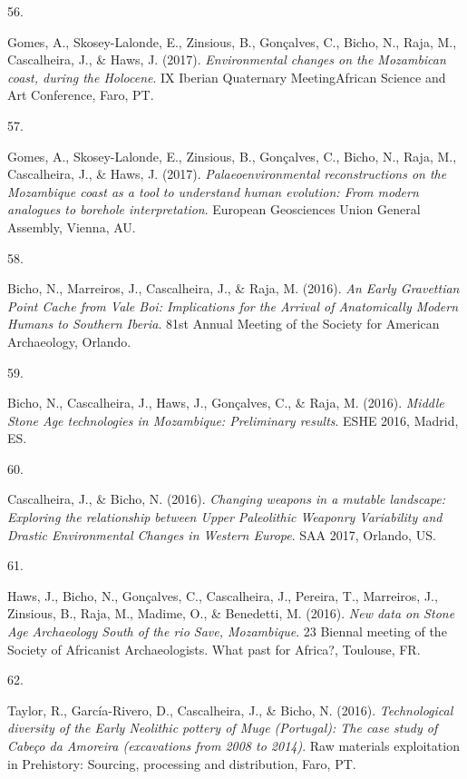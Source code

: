 \documentclass[11pt,a4paper,]{awesome-cv}
\newlength{\cslhangindent}
\newlength{\csllabelwidth}
\newenvironment{CSLReferences}[2] %
 {\begin{list}{}{%
  \setlength{\itemindent}{0pt}
  \setlength{\leftmargin}{0pt}
  \setlength{\parsep}{0pt}
  \ifodd #1
   \setlength{\leftmargin}{\cslhangindent}
   \setlength{\itemindent}{-1\cslhangindent}
  \fi
  \setlength{\itemsep}{#2\baselineskip}}}
 {\end{list}}
\newcommand{\CSLLeftMargin}[1]{\parbox[t]{\csllabelwidth}{\strut#1\strut}}
\newcommand{\CSLRightInline}[1]{\parbox[t]{\linewidth - \csllabelwidth}{\strut#1\strut}}
\begin{document}
\begin{CSLReferences}{0}{0}
\CSLLeftMargin{56. }%
\CSLRightInline{Gomes, A., Skosey-Lalonde, E., Zinsious, B., Gonçalves,
C., Bicho, N., Raja, M., Cascalheira, J., \& Haws, J. (2017).
\emph{Environmental changes on the Mozambican coast, during the
Holocene}. IX Iberian Quaternary MeetingAfrican Science and Art
Conference, Faro, PT.}

\CSLLeftMargin{57. }%
\CSLRightInline{Gomes, A., Skosey-Lalonde, E., Zinsious, B., Gonçalves,
C., Bicho, N., Raja, M., Cascalheira, J., \& Haws, J. (2017).
\emph{Palaeoenvironmental reconstructions on the Mozambique coast as a
tool to understand human evolution: From modern analogues to borehole
interpretation}. European Geosciences Union General Assembly, Vienna,
AU.}

\CSLLeftMargin{58. }%
\CSLRightInline{Bicho, N., Marreiros, J., Cascalheira, J., \& Raja, M.
(2016). \emph{An Early Gravettian Point Cache from Vale Boi:
Implications for the Arrival of Anatomically Modern Humans to Southern
Iberia}. 81st Annual Meeting of the Society for American Archaeology,
Orlando.}

\CSLLeftMargin{59. }%
\CSLRightInline{Bicho, N., Cascalheira, J., Haws, J., Gonçalves, C., \&
Raja, M. (2016). \emph{Middle Stone Age technologies in Mozambique:
Preliminary results}. ESHE 2016, Madrid, ES.}

\CSLLeftMargin{60. }%
\CSLRightInline{Cascalheira, J., \& Bicho, N. (2016). \emph{Changing
weapons in a mutable landscape: Exploring the relationship between Upper
Paleolithic Weaponry Variability and Drastic Environmental Changes in
Western Europe}. SAA 2017, Orlando, US.}

\CSLLeftMargin{61. }%
\CSLRightInline{Haws, J., Bicho, N., Gonçalves, C., Cascalheira, J.,
Pereira, T., Marreiros, J., Zinsious, B., Raja, M., Madime, O., \&
Benedetti, M. (2016). \emph{New data on Stone Age Archaeology South of
the rio Save, Mozambique}. 23 Biennal meeting of the Society of
Africanist Archaeologists. What past for Africa?, Toulouse, FR.}

\CSLLeftMargin{62. }%
\CSLRightInline{Taylor, R., García-Rivero, D., Cascalheira, J., \&
Bicho, N. (2016). \emph{Technological diversity of the Early Neolithic
pottery of Muge (Portugal): The case study of Cabeço da Amoreira
(excavations from 2008 to 2014)}. Raw materials exploitation in
Prehistory: Sourcing, processing and distribution, Faro, PT.}


\end{CSLReferences}
\end{document}
